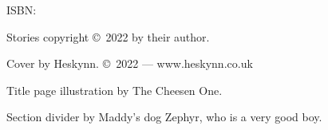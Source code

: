 \singlespacing
\thispagestyle{empty}
\null
\vfill
{\parindent0pt


\vspace{1ex}

ISBN: \ISBN

\vspace{1ex}

\textsc{\FullTitle}

\vspace{1ex}

Stories copyright \copyright\ 2022 by their author.

\vspace{1ex}

Cover by Heskynn. \copyright\ 2022 --- www.heskynn.co.uk

Title page illustration by The Cheesen One.

Section divider by Maddy's dog Zephyr, who is a very good boy.
}%

\clearpage
